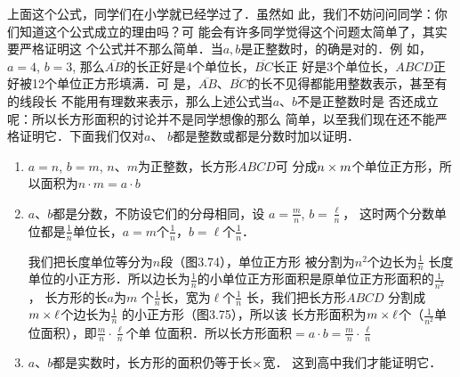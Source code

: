 上面这个公式，同学们在小学就已经学过了．虽然如
此，我们不妨问问同学：你们知道这个公式成立的理由吗？可
能会有许多同学觉得这个问题太简单了，其实要严格证明这
个公式并不那么简单．当$a,b$是正整数时，的确是对的．例
如，$a=4$, $b=3$, 那么$\overline{AB}$的长正好是4个单位长，$\overline{BC}$长正
好是3个单位长，$ABCD$正好被12个单位正方形填满．可
是，$\overline{AB}$、$\overline{BC}$的长不见得都能用整数表示，甚至有的线段长
不能用有理数来表示，那么上述公式当$a$、$b$不是正整数时是
否还成立呢：所以长方形面积的讨论并不是同学想像的那么
简单，以至我们现在还不能严格证明它．下面我们仅对$a$、
$b$都是整数或都是分数时加以证明．

\begin{enumerate}
    \item  $a=n$, $b=m$, $n$、$m$为正整数，长方形$ABCD$可
    分成$n\times m$个单位正方形，所以面积为$n\cdot m=a\cdot b$
    \item  $a$、$b$都是分数，不防设它们的分母相同，设
$a=\frac{m}{n}$, $b=\frac{\ell}{n}$，
    这时两个分数单位都是$\frac{1}{n}$单位长，$a=m$个$\frac{1}{n}$，$b=\ell$个$\frac{1}{n}$．

    我们把长度单位等分为$n$段（图3.74），单位正方形
    被分割为$n^2$个边长为$\frac{1}{n}$
    长度单位的小正方形．所以边长为$\frac{1}{n}$的小单位正方形面积是原单位正方形面积的$\frac{1}{n^2}$，
    长方形的长$a$为$m$
    个$\frac{1}{n}$长，宽为$\ell$个$\frac{1}{n}$
    长，我们把长方形$ABCD$
    分割成$m\times \ell$个边长为$\frac{1}{n}$
    的小正方形（图3.75），所以该
    长方形面积为$m\times\ell$个（$\frac{1}{n^2}$单位面积），即$\frac{m}{n}\cdot\frac{\ell}{n}$个单
    位面积．所以长方形面积$=a\cdot b=\frac{m}{n}\cdot\frac{\ell}{n}$
 \item $a$、$b$都是实数时，长方形的面积仍等于长$\times$宽．
    这到高中我们才能证明它．
\end{enumerate}




\begin{figure}[htp]\centering
    \begin{minipage}[t]{0.4\textwidth}
    \centering
{}
    \caption{}
    \end{minipage}
    \begin{minipage}[t]{0.55\textwidth}
    \centering
    \caption{}
    \end{minipage}
    \end{figure}


